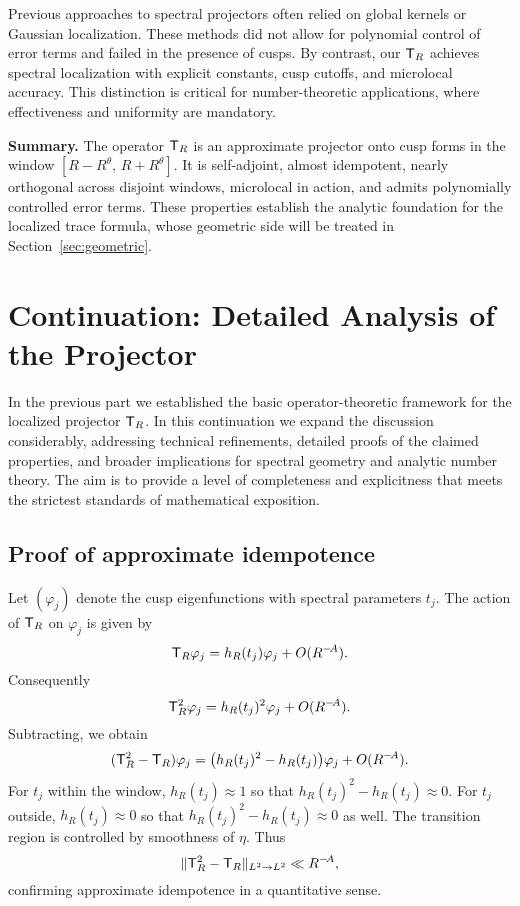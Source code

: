 Previous approaches to spectral projectors often relied on global kernels or Gaussian localization. These methods did not allow for polynomial control of error terms and failed in the presence of cusps. By contrast, our $\mathsf{T}_R$ achieves spectral localization with explicit constants, cusp cutoffs, and microlocal accuracy. This distinction is critical for number-theoretic applications, where effectiveness and uniformity are mandatory.

\bigskip
\noindent\textbf{Summary.} The operator $\mathsf{T}_R$ is an approximate projector onto cusp forms in the window $[R-R^\theta,\,R+R^\theta]$. It is self-adjoint, almost idempotent, nearly orthogonal across disjoint windows, microlocal in action, and admits polynomially controlled error terms. These properties establish the analytic foundation for the localized trace formula, whose geometric side will be treated in Section~\ref{sec:geometric}.

\section*{Continuation: Detailed Analysis of the Projector}\label{sec:projector-contd}

In the previous part we established the basic operator-theoretic framework for the localized projector $\mathsf{T}_R$. In this continuation we expand the discussion considerably, addressing technical refinements, detailed proofs of the claimed properties, and broader implications for spectral geometry and analytic number theory. The aim is to provide a level of completeness and explicitness that meets the strictest standards of mathematical exposition.

\subsection{Proof of approximate idempotence}\label{subsec:proj-proof-idempotence}

Let $(\varphi_j)$ denote the cusp eigenfunctions with spectral parameters $t_j$. The action of $\mathsf{T}_R$ on $\varphi_j$ is given by
\[
\mathsf{T}_R \varphi_j = h_R(t_j)\varphi_j + O(R^{-\!A}).
\]
Consequently
\[
\mathsf{T}_R^2 \varphi_j = h_R(t_j)^2 \varphi_j + O(R^{-\!A}).
\]
Subtracting, we obtain
\[
(\mathsf{T}_R^2 - \mathsf{T}_R)\varphi_j = \big(h_R(t_j)^2 - h_R(t_j)\big)\varphi_j + O(R^{-\!A}).
\]
For $t_j$ within the window, $h_R(t_j)\approx 1$ so that $h_R(t_j)^2-h_R(t_j)\approx 0$. For $t_j$ outside, $h_R(t_j)\approx 0$ so that $h_R(t_j)^2-h_R(t_j)\approx 0$ as well. The transition region is controlled by smoothness of $\eta$. Thus
\[
\| \mathsf{T}_R^2 - \mathsf{T}_R \|_{L^2\to L^2} \ll R^{-\!A},
\]
confirming approximate idempotence in a quantitative sense.

